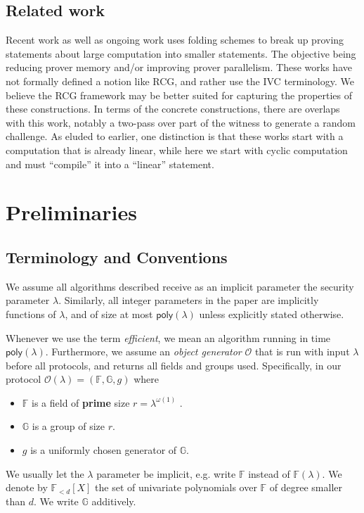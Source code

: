 \documentclass[11pt]{article} %
\newcommand{\G}{\ensuremath{{\mathbb G}}\xspace}
\newcommand{\F}{\ensuremath{\mathbb F}\xspace}
\newcommand{\defeq}{:=}
\newcommand{\polysofdeg}[1]{\ensuremath{\F_{< #1}[X]}\xspace}
\newcommand{\obgen}{\ensuremath{\mathcal O}\xspace}
\newcommand{\poly}{\ensuremath{\mathsf{poly(\lambda)}}\xspace}
\begin{document}
\subsection{Related work}
Recent work  \cite{moonmoon, mangrove} as well as ongoing work \cite{jenstalk} uses folding schemes \cite{othernova,nova} to break up proving statements about large computation into smaller statements.
The objective being reducing prover memory and/or improving prover parallelism.
These works have not formally defined a notion like RCG, and rather use the IVC terminology. We believe the RCG framework may be better suited for capturing the properties of these constructions. In terms of the concrete constructions, there are overlaps with this work, notably a two-pass over part of the witness to generate a random challenge. As eluded to earlier,
one distinction is that these works start with a computation that is already linear, while here we start with  cyclic computation and must ``compile'' it into a ``linear'' statement.




\section{Preliminaries}
\subsection{Terminology and Conventions}\label{sec:terminology}
We assume all algorithms described receive as an implicit parameter the security parameter $\lambda$.
Similarly, all integer parameters in the paper are implicitly functions of $\lambda$, and of size at most \poly unless explicitly stated otherwise.

Whenever we use the term \emph{efficient}, we mean an algorithm running in time \poly. Furthermore,
we assume an \emph{object generator} \obgen that is run with input $\lambda$ before all protocols, and returns all fields and groups used. Specifically, in our protocol $\obgen(\lambda) = (\F, \G,g)$ where
\begin{itemize}
\item \F is a field of \textbf{prime} size $r = \lambda^{\omega(1)}$
.
\item $\G$ is a group of size $r$.
\item $g$ is a uniformly chosen generator of \G.
\end{itemize}
We usually let the $\lambda$ parameter be implicit, e.g. write \F instead of $\F(\lambda)$.
We denote by \polysofdeg{d} the set of univariate polynomials over \F of degree smaller than $d$. 
We write \G additively.
\end{document}
